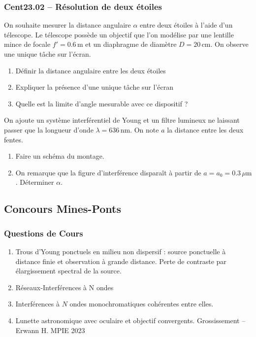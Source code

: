 \subsubsection*{Cent23.02 -- Résolution de deux étoiles }

On souhaite mesurer la distance angulaire $\alpha$ entre deux étoiles à l'aide d'un télescope. Le télescope possède un objectif que l'on modélise par une lentille mince de focale $f' = 0.6\,\text{m}$ et un diaphragme de diamètre $D = 20\,\text{cm}$. On observe une unique tâche sur l'écran.

\begin{enumerate}
\item Définir la distance angulaire entre les deux étoiles
\item Expliquer la présence d'une unique tâche sur l'écran
\item Quelle est la limite d'angle mesurable avec ce dispositif ?
\end{enumerate}

On ajoute un système interférentiel de Young et un filtre lumineux ne laissant passer que la longueur d'onde $\lambda = 636\,\text{nm}$. On note $a$ la distance entre les deux fentes.

\begin{enumerate}[resume]
\item Faire un schéma du montage.
\item On remarque que la figure d'interférence disparaît à partir de $a = a_{0} = 0.3\,\mu\text{m}$. Déterminer $\alpha$.
\end{enumerate}

\newpage
\subsection*{Concours Mines-Ponts}

\subsubsection*{Questions de Cours}
\begin{enumerate}
\item Trous d'Young ponctuels en milieu non dispersif : source ponctuelle à distance finie et observation à grande distance. Perte de contraste par élargissement spectral de la source.
\item Réseaux-Interférences à N ondes
\item Interférences à $N$ ondes monochromatiques cohérentes entre elles.
\item Lunette astronomique avec oculaire et objectif convergents. Grossissement -- Erwann H. MPIE 2023
\end{enumerate}


